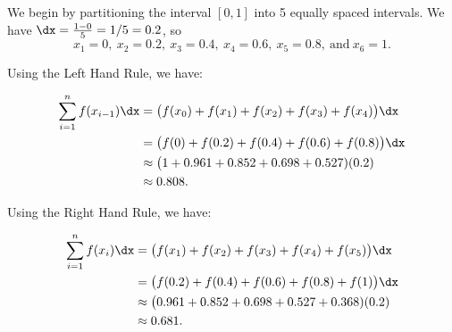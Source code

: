 \begin{solution}
{We begin by partitioning the interval $[0,1]$ into 5 equally spaced intervals. We have $\dx = \frac{1-0}5 = 1/5=0.2$, so $$x_1 = 0,\ x_2 = 0.2,\ x_3 = 0.4,\ x_4 = 0.6,\ x_5 = 0.8,\ \text{and}\ x_6 = 1.$$

Using the Left Hand Rule, we have:

\begin{align*}
\sum_{i=1}^n f(x_{i-1})\dx &= \big(f(x_0)+f(x_1) + f(x_2) + f(x_3) + f(x_4)\big)\dx \\
												&= \big(f(0) + f(0.2) + f(0.4) + f(0.6) + f(0.8)\big)\dx \\
												&\approx \big(1+0.961 + 0.852 + 0.698 + 0.527)(0.2)\\
												&\approx 0.808.
\end{align*}

Using the Right Hand Rule, we have:

\begin{align*}
\sum_{i=1}^n f(x_{i})\dx &= \big(f(x_1) + f(x_2) + f(x_3) + f(x_4)+f(x_5)\big)\dx \\
												&= \big(f(0.2) + f(0.4) + f(0.6) + f(0.8)+f(1)\big)\dx \\
												&\approx \big(0.961 +0.852 + 0.698 + 0.527 + 0.368)(0.2)\\
												&\approx 0.681.
\end{align*}




\begin{figure}
\centering
\begin{subfigure}{.5\textwidth}
  \centering
{}
\end{subfigure}
\end{figure}}
\end{solution}
